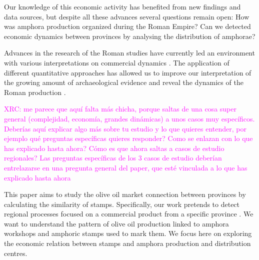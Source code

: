 \documentclass[review]{elsarticle}
\newcommand{\memo}[2]{\textcolor{#1}{#2}}
\newcommand{\xavi}[1]{\memo{magenta}{XRC: #1\\}}
\begin{document}
Our knowledge of this economic activity has benefited from new findings and data sources, but despite all these advances several questions remain open: How was amphora production organized during the Roman Empire? Can we detected economic dynamics between provinces by analysing the distribution of amphorae?





Advances in the research of the Roman studies have currently led an environment with various interpretations on commercial dynamics \citep{duncan1982economy,
temin_economy_2006,
quantifyingwilson2009}.
The application of different quantitative approaches has allowed us to improve our interpretation of the growing amount of archaeological evidence and reveal the dynamics of the Roman production %
\citep{brughmans_roman_2016,
orengo_seeds_2016,bayesian_2018,
coto-sarmiento_identifying_2018,
rubio-campillo_ecology_2018}.

\xavi{me parece que aquí falta más chicha, porque saltas de una cosa super general (complejidad, economía, grandes dinámicas) a unos casos muy específicos. Deberías aquí explicar algo más sobre tu estudio y lo que quieres entender, por ejemplo qué preguntas específicas quieres responder? Como se enlazan con lo que has explicado hasta ahora? Cómo es que ahora saltas a casos de estudio regionales? Las preguntas específicas de los 3 casos de estudio deberían entrelazarse en una pregunta general del paper, que esté vinculada a lo que has explicado hasta ahora}

This paper aims to study the olive oil market connection between provinces by calculating the similarity of stamps. Specifically, our work pretends to detect regional processes focused on a commercial product from a specific province \citep{isaksen_network_2006}. We want to understand the pattern of olive oil production linked to amphora workshops and amphoric stamps used to mark them. We focus here on exploring the economic relation between stamps and amphora production and distribution centres. 
\end{document}
